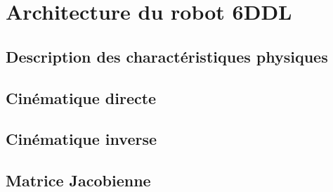 \chapter{Architecture du robot 6DDL}     %

\section{Description des charactéristiques physiques}
\section{Cinématique directe}
\section{Cinématique inverse}
\section{Matrice Jacobienne}
